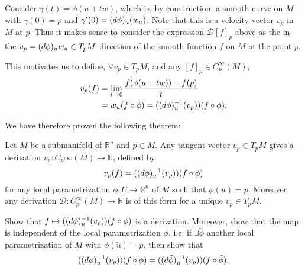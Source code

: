 \documentclass[notoc,notitlepage]{tufte-book}
\begin{document}
Consider $\gamma(t) = \phi( u + tw )$, which is, by construction, a smooth curve
on $M$ with $\gamma(0) = p$ and $\gamma'(0) = (\mathop{}\!d{\phi})_u(w_u)$. Note that
this is a \hyperref[defn:velocity_vectors_on_a_submanifold]{velocity vector}
$v_p$ in $M$ at $p$. Thus it makes sense to consider the expression
$\mathcal{D}[f]_p$ above as the  in the $v_p =
(\mathop{}\!d{\phi})_u w_u \in T_p M$ direction of the smooth function $f$ on $M$ at the
point $p$.

This motivates us to define, $\forall v_p \in T_p M$, and any $[f]_p \in
C_p^\infty(M)$,
\begin{align}
  v_p(f) &= \lim_{t \to 0} \frac{f(\phi(u + tw)) - f(p)}{t} \nonumber \\
         &= w_u (f \circ \phi) = ((\mathop{}\!d{\phi})_u^{-1}(v_p))(f \circ \phi).
         \label{eq:defining_dir_deri_on_subman}
\end{align}

We have therefore proven the following theorem:

\begin{thm}\label{thm:derivations_are_tangent_vectors_even_on_submanifolds}
  Let $M$ be a submanifold of $\mathbb{R}^n$ and $p \in M$. Any tangent vector
  $v_p \in T_p M$ gives a derivation $v_p : C_p\infty(M) \to \mathbb{R}$,
  defined by
  \begin{equation*}
    v_p(f) = ((\mathop{}\!d{\phi})_u^{-1} (v_p)) (f \circ \phi)
  \end{equation*}
  for any local parametrization $\phi : U \to \mathbb{R}^n$ of $M$ such that
  $\phi(u) = p$. Moreover, any derivation $\mathcal{D} : C_p^\infty(M) \to
  \mathbb{R}$ is of this form for a unique $v_p \in T_p M$.
\end{thm}

\begin{ex}
  Show that $f \mapsto ((\mathop{}\!d{\phi})_u^{-1} (v_p))(f \circ \phi)$ is a
  derivation. Moreover, show that the map is independent of the local
  parametrization $\phi$, i.e. if $\exists \tilde{\phi}$ another local
  parametrization of $M$ with $\tilde{\phi}(\tilde{u}) = p$, then show that
  \begin{equation*}
    ((\mathop{}\!d{\phi})_u^{-1} (v_p)) (f \circ \phi)
    = ((\mathop{}\!d{\tilde{\phi}})_u^{-1} (v_p))(f \circ \tilde{\phi}).
  \end{equation*}
\end{ex}

\end{document}
